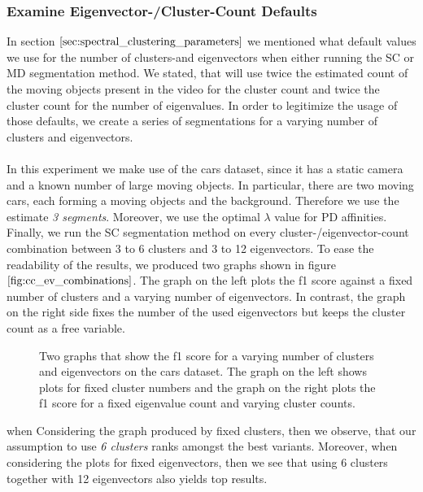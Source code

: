 \subsubsection{Examine Eigenvector-/Cluster-Count Defaults}
In section $\ref{sec:spectral_clustering_parameters}$ we mentioned what default values we use for the number of clusters-and eigenvectors when either running the SC or MD segmentation method. We stated, that will use twice the estimated count of the moving objects present in the video for the cluster count and twice the cluster count for the number of eigenvalues. In order to legitimize the usage of those defaults, we create a series of segmentations for a varying number of clusters and eigenvectors. \\ \\
In this experiment we make use of the cars dataset, since it has a static camera and a known number of large moving objects. In particular, there are two moving cars, each forming a moving objects and the background. Therefore we use the estimate \textit{3 segments}. Moreover, we use the optimal $\lambda$ value for PD affinities. Finally, we run the SC segmentation method on every cluster-/eigenvector-count combination between 3 to 6 clusters and 3 to 12 eigenvectors. To ease the readability of the results, we produced two graphs shown in figure $\ref{fig:cc_ev_combinations}$. The graph on the left plots the f1 score against a fixed number of clusters and a varying number of eigenvectors. In contrast, the graph on the right side fixes the number of the used eigenvectors but keeps the cluster count as a free variable.
\begin{figure}[H]
\begin{center}
\end{center}
\caption[Varying number of Clusters / Eigenvectors]{Two graphs that show the f1 score for a varying number of clusters and eigenvectors on the cars dataset. The graph on the left shows plots for fixed cluster numbers and the graph on the right plots the f1 score for a fixed eigenvalue count and varying cluster counts.}
\label{fig:cc_ev_combinations}
\end{figure}
when Considering the graph produced by fixed clusters, then we observe, that our assumption to use \textit{6 clusters} ranks amongst the best variants. Moreover, when considering the plots for fixed eigenvectors, then we see that using 6 clusters together with 12 eigenvectors also yields top results. \\ \\
